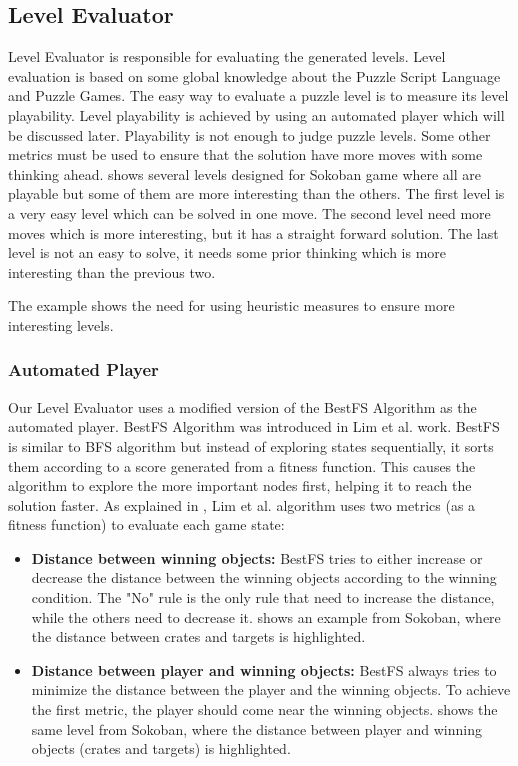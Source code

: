 \subsection{Level Evaluator}
Level Evaluator is responsible for evaluating the generated levels. Level evaluation is based on some global knowledge about the Puzzle Script Language and Puzzle Games. The easy way to evaluate a puzzle level is to measure its level playability. Level playability is achieved by using an automated player which will be discussed later. Playability is not enough to judge puzzle levels. Some other metrics must be used to ensure that the solution have more moves with some thinking ahead.  shows several levels designed for Sokoban game where all are playable but some of them are more interesting than the others. The first level is a very easy level which can be solved in one move. The second level need more moves which is more interesting, but it has a straight forward solution. The last level is not an easy to solve, it needs some prior thinking which is more interesting than the previous two.


The example shows the need for using heuristic measures to ensure more interesting levels.

\subsubsection{Automated Player}
Our Level Evaluator uses a modified version of the BestFS Algorithm as the automated player. BestFS Algorithm was introduced in Lim et al.\cite{puzzleScriptGeneration} work. BestFS is similar to BFS algorithm but instead of exploring states sequentially, it sorts them according to a score generated from a fitness function. This causes the algorithm to explore the more important nodes first, helping it to reach the solution faster. As explained in , Lim et al. algorithm uses two metrics (as a fitness function) to evaluate each game state:
\begin{itemize} \itemsep0pt \parskip0pt 
	\item \textbf{Distance between winning objects:} BestFS tries to either increase or decrease the distance between the winning objects according to the winning condition. The "No" rule is the only rule that need to increase the distance, while the others need to decrease it.  shows an example from Sokoban, where the distance between crates and targets is highlighted.
	\item \textbf{Distance between player and winning objects:} BestFS always tries to minimize the distance between the player and the winning objects. To achieve the first metric, the player should come near the winning objects.  shows the same level from Sokoban, where the distance between player and winning objects (crates and targets) is highlighted.
\end{itemize}

